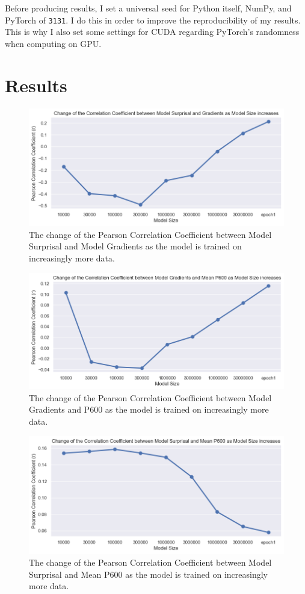 \documentclass{IEEEtran}
\begin{document}
Before producing results, I set a universal seed for Python itself, NumPy, and PyTorch of \texttt{3131}.
I do this in order to improve the reproducibility of my results.
This is why I also set some settings for CUDA regarding PyTorch's randomness when computing on GPU.

\section{Results}
\begin{figure}
    \centering
    \includegraphics[width=.9\textwidth]{correlation_change/surprisal_gradients.png}
    \caption{The change of the Pearson Correlation Coefficient between Model Surprisal and Model Gradients as the model is trained on increasingly more data.}
    \label{fig:coefficient_surprisal_gradients}
\end{figure}
\begin{figure}
    \centering
    \includegraphics[width=.9\textwidth]{correlation_change/gradients_p600.png}
    \caption{The change of the Pearson Correlation Coefficient between Model Gradients and P600 as the model is trained on increasingly more data.}
    \label{fig:coefficient_gradients_p600}
\end{figure}
\begin{figure}
    \centering
    \includegraphics[width=.9\textwidth]{correlation_change/surprisal_p600.png}
    \caption{The change of the Pearson Correlation Coefficient between Model Surprisal and Mean P600 as the model is trained on increasingly more data.}
    \label{fig:coefficient_surprisal_p600}
\end{figure}
\end{document}
